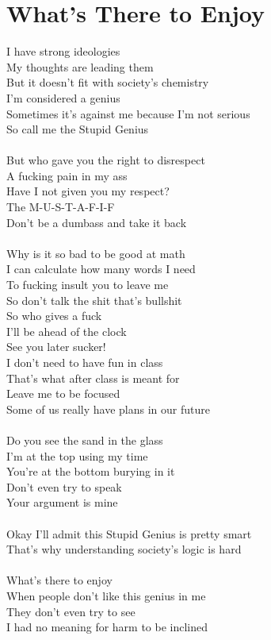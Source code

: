 \documentclass[12pt, b5paper, oneside]{book}
\begin{document}
\section{What's There to Enjoy}
I have strong ideologies
\\My thoughts are leading them
\\But it doesn't fit with society's chemistry
\\I'm considered a genius
\\Sometimes it's against me because I'm not serious
\\So call me the Stupid Genius
%
\\\\But who gave you the right to disrespect
\\A fucking pain in my ass
\\Have I not given you my respect?
\\The M-U-S-T-A-F-I-F
\\Don't be a dumbass and take it back
%
\\\\Why is it so bad to be good at math
\\I can calculate how many words I need
\\To fucking insult you to leave me
\\So don't talk the shit that's bullshit
%
\\So who gives a fuck
\\I'll be ahead of the clock
\\See you later sucker!
\\I don't need to have fun in class
\\That's what after class is meant for
\\Leave me to be focused
\\Some of us really have plans in our future
%
\\\\Do you see the sand in the glass
\\I'm at the top using my time
\\You're at the bottom burying in it
\\Don't even try to speak
\\Your argument is mine
%
\\\\Okay I'll admit this Stupid Genius is pretty smart
\\That's why understanding society's logic is hard
%
\\\\What's there to enjoy
\\When people don't like this genius in me
\\They don't even try to see
\\I had no meaning for harm to be inclined
\newpage
\end{document}

